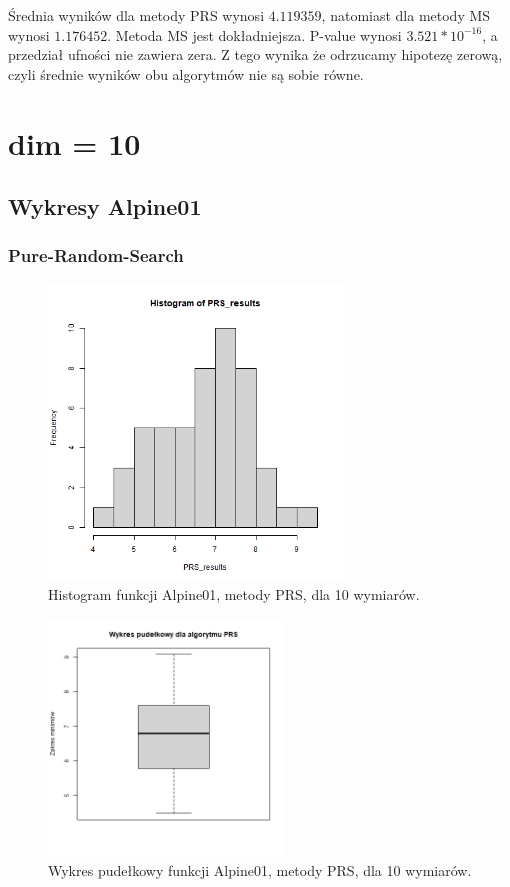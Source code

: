 \documentclass{lab}
\begin{document}
 Średnia wyników dla metody PRS wynosi $4.119359$, natomiast dla metody MS wynosi $1.176452$. Metoda MS jest dokładniejsza. P-value wynosi $3.521*10^{-16}$, a przedział ufności nie zawiera zera. Z tego wynika że odrzucamy hipotezę zerową, czyli średnie wyników obu algorytmów nie są sobie równe.

\section{dim = 10}
\subsection{Wykresy Alpine01}
\subsubsection{Pure-Random-Search}
\begin{figure}[H]
  \centering
  \includegraphics[width=0.7\textwidth]{img/dim10_PRS_Alpine01_his.png}
  \caption{Histogram funkcji Alpine01, metody PRS, dla 10 wymiarów.}
\end{figure}
\begin{figure}[H]
  \centering
  \includegraphics[width=0.56\textwidth]{img/dim10_PRS_Alpine01.png}
  \caption{Wykres pudełkowy funkcji Alpine01, metody PRS, dla 10 wymiarów.}
\end{figure}
\end{document}
